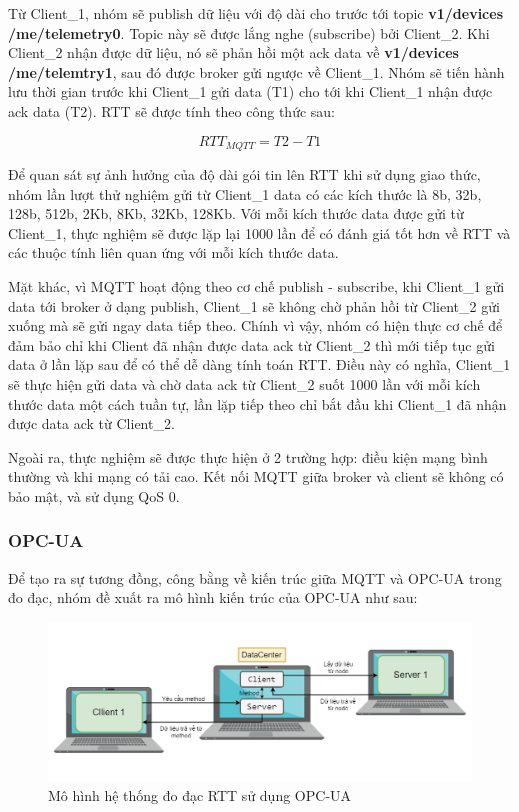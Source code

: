 Từ Client\_1, nhóm sẽ publish dữ liệu với độ dài cho trước tới topic \textbf{v1/devices\\/me/telemetry0}. Topic này sẽ được lắng nghe (subscribe) bởi Client\_2. Khi Client\_2 nhận được dữ liệu, nó sẽ phản hồi một ack data về \textbf{v1/devices\\/me/telemtry1}, sau đó được broker gửi ngược về Client\_1. Nhóm sẽ tiến hành lưu thời gian trước khi Client\_1 gửi data (T1) cho tới khi Client\_1 nhận được ack data (T2). RTT sẽ được tính theo công thức sau:

\begin{equation}
    RTT_{MQTT} = T2 - T1
\end{equation}

Để quan sát sự ảnh hưởng của độ dài gói tin lên RTT khi sử dụng giao thức, nhóm lần lượt thử nghiệm gửi từ Client\_1 data có các kích thước là 8b, 32b, 128b, 512b, 2Kb, 8Kb, 32Kb, 128Kb. Với mỗi kích thước data được gửi từ Client\_1, thực nghiệm sẽ được lặp lại 1000 lần để có đánh giá tốt hơn về RTT và các thuộc tính liên quan ứng với mỗi kích thước data. 

Mặt khác, vì MQTT hoạt động theo cơ chế publish - subscribe, khi Client\_1 gửi data tới broker ở dạng publish, Client\_1 sẽ không chờ phản hồi từ Client\_2 gửi xuống mà sẽ gửi ngay data tiếp theo. Chính vì vậy, nhóm có hiện thực cơ chế để đảm bảo chỉ khi Client đã nhận được data ack từ Client\_2 thì mới tiếp tục gửi data ở lần lặp sau để có thể dễ dàng tính toán RTT. Điều này có nghĩa, Client\_1 sẽ thực hiện gửi data và chờ data ack từ Client\_2 suốt 1000 lần với mỗi kích thước data một cách tuần tự, lần lặp tiếp theo chỉ bắt đầu khi Client\_1 đã nhận được data ack từ Client\_2.

Ngoài ra, thực nghiệm sẽ được thực hiện ở 2 trường hợp: điều kiện mạng bình thường và khi mạng có tải cao. Kết nối MQTT giữa broker và client sẽ không có bảo mật, và sử dụng QoS 0.

\subsubsection{OPC-UA}
Để tạo ra sự tương đồng, công bằng về kiến trúc giữa MQTT và OPC-UA trong đo đạc, nhóm đề xuất ra mô hình kiến trúc của OPC-UA như sau:

\begin{figure}[!h]
    \centering
    \includegraphics[width=\textwidth]{Images/Comparing_experiment/opcua-architecture.jpg}
    \caption{Mô hình hệ thống đo đạc RTT sử dụng OPC-UA}
    \label{fig:comp_opcua}
\end{figure}

